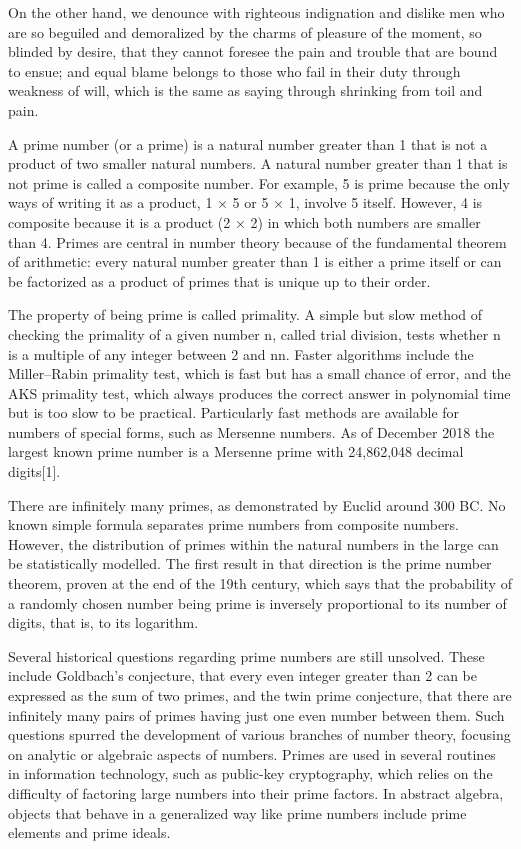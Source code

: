 On the other hand, we denounce with righteous indignation and dislike men who
are so beguiled and demoralized by the charms of pleasure of the moment, so
blinded by desire, that they cannot foresee the pain and trouble that are bound
to ensue; and equal blame belongs to those who fail in their duty through
weakness of will, which is the same as saying through shrinking from toil and
pain.

A prime number (or a prime) is a natural number greater than 1 that is not a
product of two smaller natural numbers. A natural number greater than 1 that is
not prime is called a composite number. For example, 5 is prime because the only
ways of writing it as a product, 1 × 5 or 5 × 1, involve 5 itself. However, 4 is
composite because it is a product (2 × 2) in which both numbers are smaller than
4. Primes are central in number theory because of the fundamental theorem of
arithmetic: every natural number greater than 1 is either a prime itself or can
be factorized as a product of primes that is unique up to their order.

The property of being prime is called primality. A simple but slow method of
checking the primality of a given number n, called trial
division, tests whether n is a multiple of any integer between
2 and { { {n}}}{ {n}}. Faster algorithms include the
Miller–Rabin primality test, which is fast but has a small chance of error, and
the AKS primality test, which always produces the correct answer in polynomial
time but is too slow to be practical. Particularly fast methods are available
for numbers of special forms, such as Mersenne numbers. As of December 2018 the
largest known prime number is a Mersenne prime with 24,862,048 decimal
digits[1].

There are infinitely many primes, as demonstrated by Euclid around 300 BC. No
known simple formula separates prime numbers from composite numbers. However,
the distribution of primes within the natural numbers in the large can be
statistically modelled. The first result in that direction is the prime number
theorem, proven at the end of the 19th century, which says that the probability
of a randomly chosen number being prime is inversely proportional to its number
of digits, that is, to its logarithm.

Several historical questions regarding prime numbers are still unsolved. These
include Goldbach's conjecture, that every even integer greater than 2 can be
expressed as the sum of two primes, and the twin prime conjecture, that there
are infinitely many pairs of primes having just one even number between
them. Such questions spurred the development of various branches of number
theory, focusing on analytic or algebraic aspects of numbers. Primes are used in
several routines in information technology, such as public-key cryptography,
which relies on the difficulty of factoring large numbers into their prime
factors. In abstract algebra, objects that behave in a generalized way like
prime numbers include prime elements and prime ideals.

